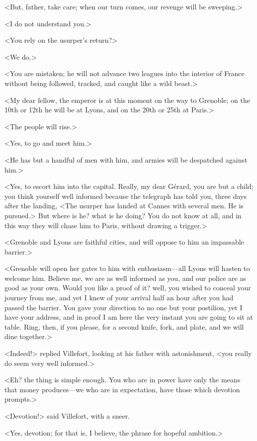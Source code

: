  <But, father, take care; when our turn comes, our revenge will be sweeping.> 

 <I do not understand you.> 

 <You rely on the usurper's return?> 

 <We do.> 

 <You are mistaken; he will not advance two leagues into the interior of France without being followed, tracked, and caught like a wild beast.> 

 <My dear fellow, the emperor is at this moment on the way to Grenoble; on the 10th or 12th he will be at Lyons, and on the 20th or 25th at Paris.> 

 <The people will rise.> 

 <Yes, to go and meet him.> 

 <He has but a handful of men with him, and armies will be despatched against him.> 

 <Yes, to escort him into the capital. Really, my dear Gérard, you are but a child; you think yourself well informed because the telegraph has told you, three days after the landing, <The usurper has landed at Cannes with several men. He is pursued.> But where is he? what is he doing? You do not know at all, and in this way they will chase him to Paris, without drawing a trigger.> 

 <Grenoble and Lyons are faithful cities, and will oppose to him an impassable barrier.> 

 <Grenoble will open her gates to him with enthusiasm—all Lyons will hasten to welcome him. Believe me, we are as well informed as you, and our police are as good as your own. Would you like a proof of it? well, you wished to conceal your journey from me, and yet I knew of your arrival half an hour after you had passed the barrier. You gave your direction to no one but your postilion, yet I have your address, and in proof I am here the very instant you are going to sit at table. Ring, then, if you please, for a second knife, fork, and plate, and we will dine together.> 

 <Indeed!> replied Villefort, looking at his father with astonishment, <you really do seem very well informed.> 

 <Eh? the thing is simple enough. You who are in power have only the means that money produces—we who are in expectation, have those which devotion prompts.> 

 <Devotion!> said Villefort, with a sneer. 

 <Yes, devotion; for that is, I believe, the phrase for hopeful ambition.> 

